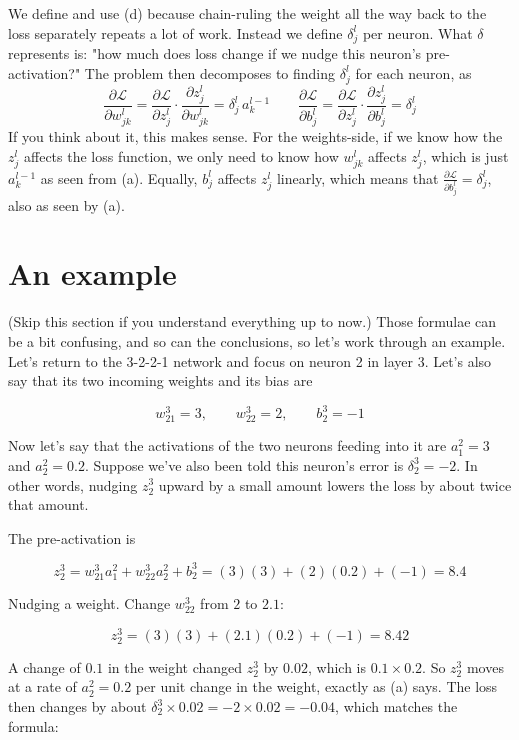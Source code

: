 \documentclass{article}
\begin{document}
We define and use (d) because chain-ruling the weight all the way back to the loss separately repeats a lot of work. Instead we define $\delta^l_j$ per neuron. What $\delta$ represents is: "how much does loss change if we nudge this neuron's pre-activation?" The problem then decomposes to finding $\delta^l_j$ for each neuron, as
\[{\frac{\partial \mathcal{L}}{\partial w^l_{jk}} = \frac{\partial \mathcal{L}}{\partial z^l_j}\cdot\frac{\partial z^l_j}{\partial w^l_{jk}} = \delta^l_j \, a^{l-1}_k \qquad \frac{\partial \mathcal{L}}{\partial b^l_j} = \frac{\partial \mathcal{L}}{\partial z^l_j}\cdot\frac{\partial z^l_j}{\partial b^l_j} = \delta^l_j}\]
If you think about it, this makes sense. For the weights-side, if we know how the $z^l_j$ affects the loss function, we only need to know how $w^l_{jk}$ affects $z^l_j$, which is just $a^{l-1}_k$ as seen from (a). Equally, $b^l_j$ affects $z^l_j$ linearly, which means that $\frac{\partial \mathcal{L}}{\partial b^l_j} = \delta^l_j$, also as seen by (a). 

\section*{An example}
(Skip this section if you understand everything up to now.)
Those formulae can be a bit confusing, and so can the conclusions, so let’s work through an example. Let's return to the 3-2-2-1 network and focus on neuron 2 in layer 3. Let's also say that its two incoming weights and its bias are

\[w^3_{21} = 3, \qquad w^3_{22} = 2, \qquad b^3_2 = -1\]

Now let's say that the activations of the two neurons feeding into it are $a^2_1 = 3$ and $a^2_2 = 0.2$. Suppose we’ve also been told this neuron’s error is $\delta^3_2 = -2$. In other words, nudging $z^3_2$ upward by a small amount lowers the loss by about twice that amount.

The pre-activation is

\[z^3_2 = w^3_{21}a^2_1 + w^3_{22}a^2_2 + b^3_2 = (3)(3) + (2)(0.2) + (-1) = 8.4\]

Nudging a weight. Change $w^3_{22}$ from $2$ to $2.1$:

\[z^3_2 = (3)(3) + (2.1)(0.2) + (-1) = 8.42\]

A change of $0.1$ in the weight changed $z^3_2$ by $0.02$, which is $0.1 \times 0.2$. So $z^3_2$ moves at a rate of $a^2_2 = 0.2$ per unit change in the weight, exactly as (a) says. The loss then changes by about $\delta^3_2 \times 0.02 = -2 \times 0.02 = -0.04$, which matches the formula:
\end{document}
